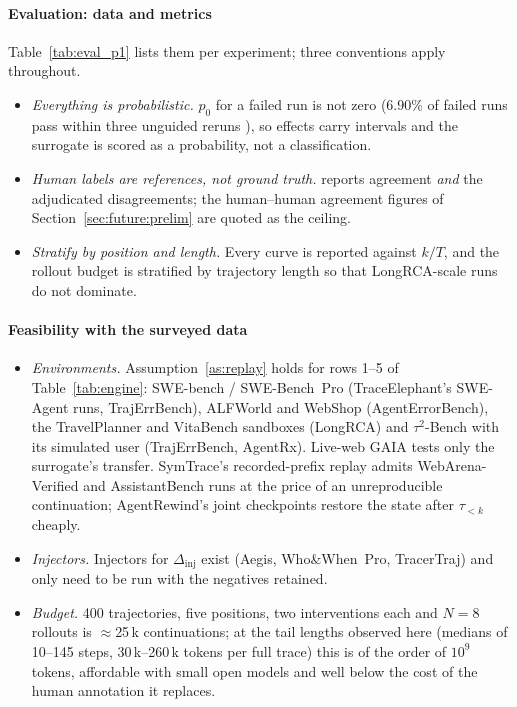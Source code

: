 \documentclass[10pt,a4paper]{article}
\begin{document}
\paragraph{Evaluation: data and metrics} Table~\ref{tab:eval_p1} lists them per experiment; three conventions apply throughout.
\begin{itemize}[leftmargin=1.1em]
\item \emph{Everything is probabilistic.} $p_0$ for a failed run is not zero (6.90\% of failed runs pass within three unguided reruns \cite{luan2026symtrace}), so effects carry intervals and the surrogate is scored as a probability, not a classification.
\item \emph{Human labels are references, not ground truth.}  reports agreement \emph{and} the adjudicated disagreements; the human--human agreement figures of Section~\ref{sec:future:prelim} are quoted as the ceiling.
\item \emph{Stratify by position and length.} Every curve is reported against $k/T$, and the rollout budget is stratified by trajectory length so that LongRCA-scale runs do not dominate.
\end{itemize}

\paragraph{Feasibility with the surveyed data}
\begin{itemize}[leftmargin=1.1em]
\item \emph{Environments.} Assumption~\ref{as:replay} holds for rows 1--5 of Table~\ref{tab:engine}: SWE-bench / SWE-Bench~Pro (TraceElephant's SWE-Agent runs, TrajErrBench), ALFWorld and WebShop (AgentErrorBench), the TravelPlanner and VitaBench sandboxes (LongRCA) and $\tau^2$-Bench with its simulated user (TrajErrBench, AgentRx). Live-web GAIA tests only the surrogate's transfer. SymTrace's recorded-prefix replay admits WebArena-Verified and AssistantBench runs at the price of an unreproducible continuation; AgentRewind's joint checkpoints \cite{zhuang2026agentrewind} restore the state after $\tau_{<k}$ cheaply.
\item \emph{Injectors.} Injectors for $\Delta_{\mathrm{inj}}$ exist (Aegis, Who\&When~Pro, TracerTraj) and only need to be run with the negatives retained.
\item \emph{Budget.} 400 trajectories, five positions, two interventions each and $N=8$ rollouts is $\approx$25\,k continuations; at the tail lengths observed here (medians of 10--145 steps, 30\,k--260\,k tokens per full trace) this is of the order of $10^9$ tokens, affordable with small open models and well below the cost of the human annotation it replaces.
\end{itemize}
\end{document}
